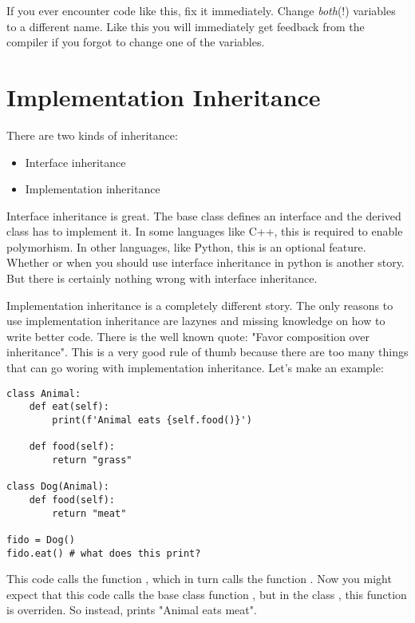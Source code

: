 If you ever encounter code like this, fix it immediately. Change \textit{both}(!) variables to a different name. Like this you will immediately get feedback from the compiler if you forgot to change one of the variables.

\section{Implementation Inheritance}

There are two kinds of inheritance:
\begin{itemize}
    \item Interface inheritance
    \item Implementation inheritance
\end{itemize}

Interface inheritance is great. The base class defines an interface and the derived class has to implement it. In some languages like C++, this is required to enable polymorhism. In other languages, like Python, this is an optional feature. Whether or when you should use interface inheritance in python is another story. But there is certainly nothing wrong with interface inheritance.

Implementation inheritance is a completely different story. The only reasons to use implementation inheritance are lazynes and missing knowledge on how to write better code. There is the well known quote: "Favor composition over inheritance". This is a very good rule of thumb because there are too many things that can go woring with implementation inheritance. Let's make an example:

\begin{programcode}{}
\begin{verbatim}
class Animal:
    def eat(self):
        print(f'Animal eats {self.food()}')

    def food(self):
        return "grass"

class Dog(Animal):
    def food(self):
        return "meat"

fido = Dog()
fido.eat() # what does this print?
\end{verbatim}
\end{programcode}

This code calls the function , which in turn calls the function . Now you might expect that this code calls the base class function , but in the class , this function is overriden. So instead,  prints "Animal eats meat".

